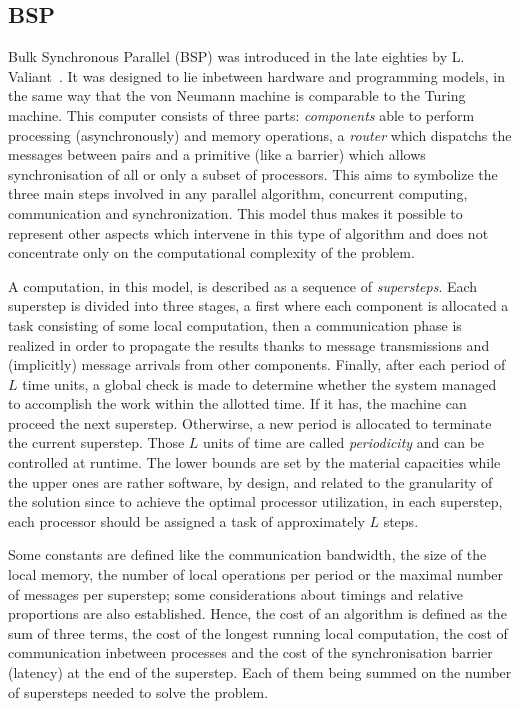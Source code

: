 \subsection{BSP}

Bulk Synchronous Parallel (BSP) was introduced in the late eighties by L. Valiant~\cite{valiant1990bridging}. It was designed to lie inbetween hardware and programming models, in the same way that the von Neumann machine is comparable to the Turing machine. This computer consists of three parts: \textit{components} able to perform processing (asynchronously) and memory operations, a \textit{router} which dispatchs the messages between pairs and a primitive (like a barrier) which allows synchronisation of all or only a subset of processors. This aims to symbolize the three main steps involved in any parallel algorithm, concurrent computing, communication and synchronization. This model thus makes it possible to represent other aspects which intervene in this type of algorithm and does not concentrate only on the computational complexity of the problem.

A computation, in this model, is described as a sequence of \textit{supersteps}. Each superstep is divided into three stages, a first where each component is allocated a task consisting of some local computation, then a communication phase is realized in order to propagate the results thanks to message transmissions and (implicitly) message arrivals from other components. Finally, after each period of $L$ time units, a global check is made to determine whether the system managed to accomplish the work within the allotted time. If it has, the machine can proceed the next superstep. Otherwirse, a new period is allocated to terminate the current superstep. Those $L$ units of time are called \textit{periodicity} and can be controlled at runtime. The lower bounds are set by the material capacities while the upper ones are rather software, by design, and related to the granularity of the solution since to achieve the optimal processor utilization, in each superstep, each processor should be assigned a task of approximately $L$ steps.

Some constants are defined like the communication bandwidth, the size of the local memory, the number of local operations per period or the maximal number of messages per superstep; some considerations about timings and relative proportions are also established. Hence, the cost of an algorithm is defined as the sum of three terms, the cost of the longest running local computation, the cost of communication inbetween processes and the cost of the synchronisation barrier (latency) at the end of the superstep. Each of them being summed on the number of supersteps needed to solve the problem.

